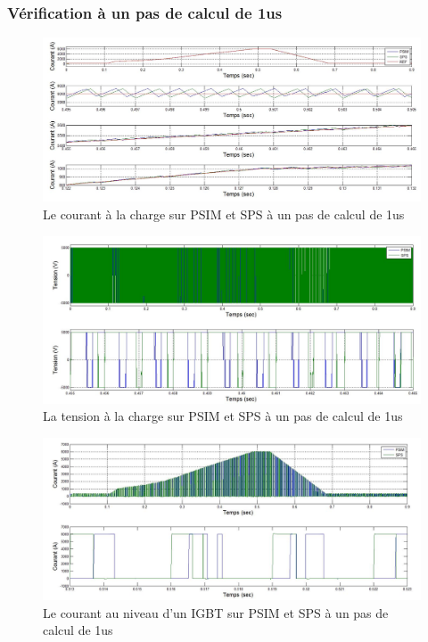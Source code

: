 \documentclass[11pt,letterpaper,final]{report}
\begin{document}
\clearpage
\subsubsection{Vérification à un pas de calcul de 1us}


\begin{figure}[h!]
\centering
\includegraphics[scale=0.5]{Fig/DCPDCN/DCPCourantCharge1u.jpg}
\caption{Le courant à la charge sur PSIM et SPS à un pas de calcul de 1us}
\label{DC_ch_cou_1}
\end{figure}


\begin{figure}[h!]
\centering
\includegraphics[scale=0.5]{Fig/DCPDCN/DCPTensionCharge1u.jpg}
\caption{La tension à la charge sur PSIM et SPS à un pas de calcul de 1us}
\label{DC_ch_ten_1}
\end{figure}


\begin{figure}[h!]
\centering
\includegraphics[scale=0.5]{Fig/DCPDCN/DCPCourantIGBT1u.jpg}
\caption{Le courant au niveau d'un IGBT sur PSIM et SPS à un pas de calcul de 1us}
\label{DC_IG_cou_1}
\end{figure}
\end{document}
